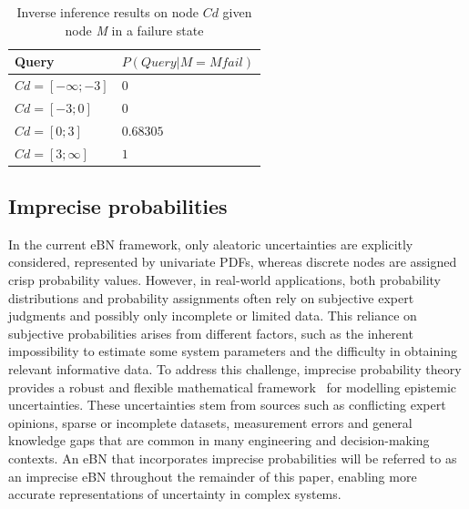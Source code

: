 \begin{table}[hbt!]
    \begin{center}
        \caption{Inverse inference results on node $Cd$ given node \textit{M} in a failure state}\label{inverse_inference_tab}
        \begin{tabular}{P{3cm}P{4cm}}
            \textbf{Query} & \textbf{$P(Query | M = M fail)$} \\
            \midrule
            $Cd = [-\infty;-3]$ & $0$ \\
            $Cd = [-3;0]$ & $0$ \\
            $Cd = [0;3]$ & $0.68305$ \\
            $Cd = [3;\infty]$ & $1$ \\
        \end{tabular}
    \end{center}
\end{table}

\subsection{Imprecise probabilities}
In the current eBN framework, only aleatoric uncertainties are explicitly considered, represented by univariate PDFs, whereas discrete nodes are assigned crisp probability values. 
However, in real-world applications, both probability distributions and probability assignments often rely on subjective expert judgments and possibly only incomplete or limited data. 
This reliance on subjective probabilities arises from different factors, such as the inherent impossibility to estimate some system parameters and the difficulty in obtaining relevant informative data. 
To address this challenge, imprecise probability theory provides a robust and flexible mathematical framework~\cite{beer_imprecise_2013-1} for modelling epistemic uncertainties. 
These uncertainties stem from sources such as conflicting expert opinions, sparse or incomplete datasets, measurement errors and general knowledge gaps that are common in many engineering and decision-making contexts. 
An eBN that incorporates imprecise probabilities will be referred to as an imprecise eBN throughout the remainder of this paper, enabling more accurate representations of uncertainty in complex systems.

